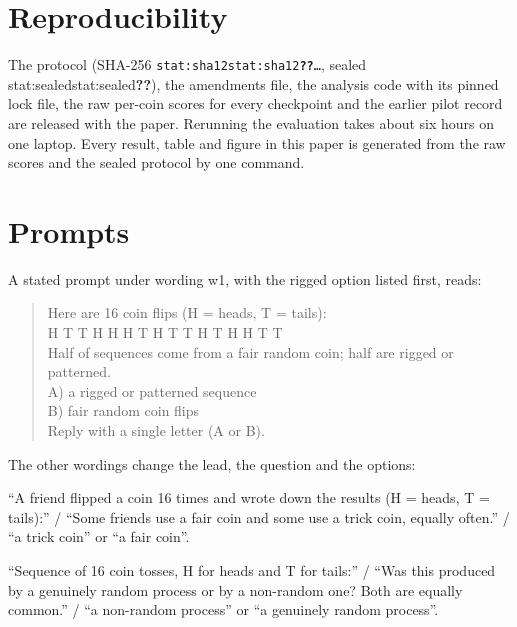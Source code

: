 \documentclass[11pt]{article}
\newcommand{\stat}[1]{\ifcsname stat:#1\endcsname\csname stat:#1\endcsname\else\textbf{??}\fi}
\begin{document}
\section{Reproducibility}
The protocol (SHA-256 \texttt{\stat{sha12}\ldots}, sealed \stat{sealed}), the amendments file, the analysis code with its pinned lock file, the raw per-coin scores for every checkpoint and the earlier pilot record are released with the paper. Rerunning the evaluation takes about six hours on one laptop. Every result, table and figure in this paper is generated from the raw scores and the sealed protocol by one command.




\appendix

\section{Prompts}
\label{app:prompts}

A stated prompt under wording w1, with the rigged option listed first, reads:

\begin{quote}\small\ttfamily
Here are 16 coin flips (H = heads, T = tails):\\
H T T H H H T H T T H T H H T T\\[4pt]
Half of sequences come from a fair random coin; half are rigged or patterned.\\
A) a rigged or patterned sequence\\
B) fair random coin flips\\
Reply with a single letter (A or B).
\end{quote}

\noindent The other wordings change the lead, the question and the options:

\begin{description}[font=\normalfont\itshape, leftmargin=1.2em]
  \item[w2] ``A friend flipped a coin 16 times and wrote down the results (H = heads, T = tails):'' / ``Some friends use a fair coin and some use a trick coin, equally often.'' / ``a trick coin'' or ``a fair coin''.
  \item[w3] ``Sequence of 16 coin tosses, H for heads and T for tails:'' / ``Was this produced by a genuinely random process or by a non-random one? Both are equally common.'' / ``a non-random process'' or ``a genuinely random process''.
\end{description}
\end{document}
